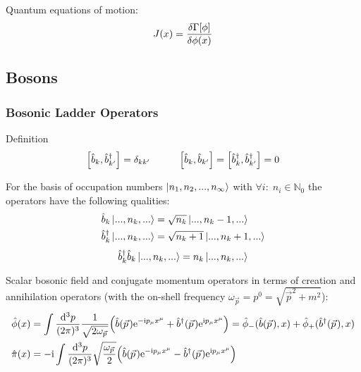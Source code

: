 			Quantum equations of motion:
			\begin{equation}
				J(x)=\fdv{\Gamma\qty[\phi]}{\phi(x)}
			\end{equation}


	\subsection{Bosons}
		\subsubsection{Bosonic Ladder Operators}
		\label{Sec:BosonicCreationAndAnnihilationOperators}
			Definition
			\begin{equation}
				\comm{\hat{b}_k}{\hat{b}_{k'}^\dagger} = \delta_{kk'}
				\hsp
				\comm{\hat{b}_k}{\hat{b}_{k'}} = \comm{\hat{b}_k^\dagger}{\hat{b}_{k'}^\dagger} = 0
			\end{equation}

			\noindent
			For the basis of occupation numbers $\Ket{n_1, n_2, ..., n_\infty}$ with $\forall i:\;n_i\in \mathbb{N}_0$ the operators have the following qualities:
			\begin{equation}
				\begin{aligned}
					\hat{b}_k \Ket{...,n_k,...} &= \sqrt{n_k} \Ket{...,n_k-1,...} \\
					\hat{b}_k^\dagger \Ket{...,n_k,...} &= \sqrt{n_k+1} \Ket{...,n_k+1,...} \\
				\end{aligned}
			\end{equation}
			\begin{equation}
				\hat{b}_k^\dagger \hat{b}_k \Ket{...,n_k,...} = n_k \Ket{...,n_k,...}
			\end{equation}

			\noindent
			Scalar bosonic field and conjugate momentum operators in terms of creation and annihilation operators (with the on-shell frequency $\omega_{\vec{p}} = p^0 = \sqrt{\vec{p}^2 + m^2}$):
			\begin{equation}
				 \begin{aligned}
					\hat{\phi}(x) &= \int \frac{\dd^3 p}{(2\pi)^3} \frac{1}{\sqrt{2 \omega_{\vec{p}}}} \qty( \hat{b}(\vec{p}) \ex^{-\i p_\mu x^\mu} + \hat{b}^\dagger(\vec{p}) \ex^{\i p_\mu x^\mu} ) = \hat{\phi}_{-}(\hat{b}(\vec{p}),x) + \hat{\phi}_{+}(\hat{b}^\dagger(\vec{p}),x) \\
					\hat{\pi}(x) &= -\i \int \frac{\dd^3 p}{(2\pi)^3} \sqrt{\frac{\omega_{\vec{p}}}{2}} \qty( \hat{b}(\vec{p}) \ex^{-\i p_\mu x^\mu} - \hat{b}^\dagger(\vec{p}) \ex^{\i p_\mu x^\mu} ) \\
				 \end{aligned}
			\end{equation}
			
